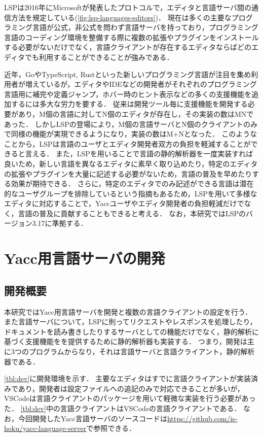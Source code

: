 \documentclass[fontsize=9bp,twocolumn,column_gap=2.36zw,a4paper,report]{jlreq}
\begin{document}
LSPは2016年にMicrosoftが発表したプロトコルで，エディタと言語サーバ間の通信方法を規定している(\ref{fig:lsp-languages-editors})．
現在は多くの主要なプログラミング言語が公式，非公式を問わず言語サーバを持っており\cite{lsp_impl}，プログラミング言語のコーディング環境を整備する際に複数の拡張やプラグインをインストールする必要がないだけでなく，言語クライアントが存在するエディタならばどのエディタでも利用することができることが強みである．\par
近年，GoやTypeScript, Rustといった新しいプログラミング言語が注目を集め利用者が増えているが，エディタやIDEなどの開発者がそれぞれのプログラミング言語用に補完や定義ジャンプ，ホバー時のヒント表示などの多くの支援機能を追加するには多大な労力を要する．
従来は開発ツール毎に支援機能を開発する必要があり，M個の言語に対してN個のエディタが存在し，その実装の数はM\times Nであった．
しかしLSPの登場により，M個の言語サーバとN個のクライアントのみで同様の機能が実現できるようになり，実装の数はM+Nとなった．
このようなことから，LSPは言語のユーザとエディタ開発者双方の負担を軽減することができると言える．
また，LSPを用いることで言語の静的解析器を一度実装すれば良いため，新しい言語を異なるエディタに素早く取り込めたり，特定のエディタの拡張やプラグインを大量に記述する必要がないため，言語の普及を早めたりする効果が期待できる．
さらに，特定のエディタでのみ記述ができる言語は潜在的なユーザグループを排除しているという指摘\cite{decoupling}もあるため，LSPを用いて多様なエディタに対応することで，Yaccユーザやエディタ開発者の負担軽減だけでなく，言語の普及に貢献することもできると考える．
なお，本研究ではLSPのバージョン3.17に準拠する．
\newline

\chapter{Yacc用言語サーバの開発}
\section{開発概要}

本研究ではYacc用言語サーバを開発と複数の言語クライアントの設定を行う．
また言語サーバについて，LSPに則ってリクエストやレスポンスを処理したり，ドキュメントを読み書きしたりするサーバとしての機能だけでなく，静的解析に基づく支援機能をを提供するために静的解析器も実装する．
つまり，開発は主に3つのプログラムからなり，それは言語サーバと言語クライアント，静的解析器である．\par
\ref{tbl:dev}に開発環境を示す．
主要なエディタはすでに言語クライアントが実装済みであり，開発者は設定ファイルへの追記のみで対応できることが多いが，VSCodeは言語クライアントのパッケージを用いて軽微な実装を行う必要があった．
\ref{tbl:dev}中の言語クライアントはVSCodeの言語クライアントである．
なお，今回開発したYacc言語サーバのソースコードは\url{https://github.com/is-hoku/yacc-language-server}で参照できる．
\end{document}
